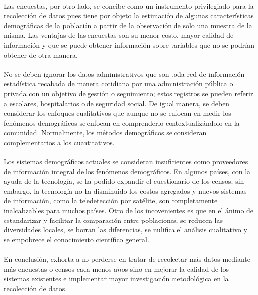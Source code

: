 \documentclass[10pt,spanish,letterpaper]{article}
\theoremstyle{plain}
\begin{document}
\\
Las encuestas, por otro lado, se concibe como un instrumento privilegiado para la recolecci\'on de datos pues tiene por objeto la estimaci\'on de algunas caracter\'isticas demogr\'aficas de la poblaci\'on a partir de la observaci\'on de solo una muestra de la misma. Las ventajas de las encuestas son su menor costo, mayor calidad de informaci\'on  y que se puede obtener informaci\'on sobre variables que no se podr\'ian obtener de otra manera.\\
\\
No se deben ignorar los datos administrativos que son toda red de informaci\'on estad\'istica recabada de manera cotidiana por una administraci\'on p\'ublica o privada con un objetivo de gesti\'on o seguimiento; estos registros se pueden referir a escolares, hospitalarios o de seguridad social. De igual manera, se deben considerar los enfoques cualitativos que aunque no se enfocan en medir los fen\'omenos demogr\'aficos se enfocan en comprenderlo contextualiz\'andolo en la comunidad. Normalmente, los m\'etodos demogr\'aficos se consideran complementarios a los cuantitativos.\\
\\
Los sistemas demogr\'aficos actuales se consideran insuficientes como proveedores de informaci\'on integral de los fen\'omenos demogr\'aficos. En algunos pa\'ises, con la ayuda de la tecnolog\'ia, se ha podido expandir el cuestionario de los censos; sin embargo, la tecnolog\'ia no ha disminuido los costos agregados y nuevos sistemas de informaci\'on, como la teledetecci\'on por sat\'elite, son completamente inalcabzables para muchos pa\'ises. Otro de los incovenientes es que en el \'animo de estandarizar y facilitar la comparaci\'on entre poblaciones, se reducen las diversidades locales, se borran las diferencias, se nulifica el an\'alisis cualitativo y se empobrece el conocimiento cient\'ifico general.\\
\\
En conclusi\'on, \cite{tabutin1997sistemas} exhorta a no perderse en tratar de recolectar m\'as datos mediante m\'as encuestas o censos cada menos a$\tilde{n}$os sino en mejorar la calidad de los sistemas existentes e implementar mayor investigaci\'on metodol\'ogica en la recolecci\'on de datos.


\end{document}
